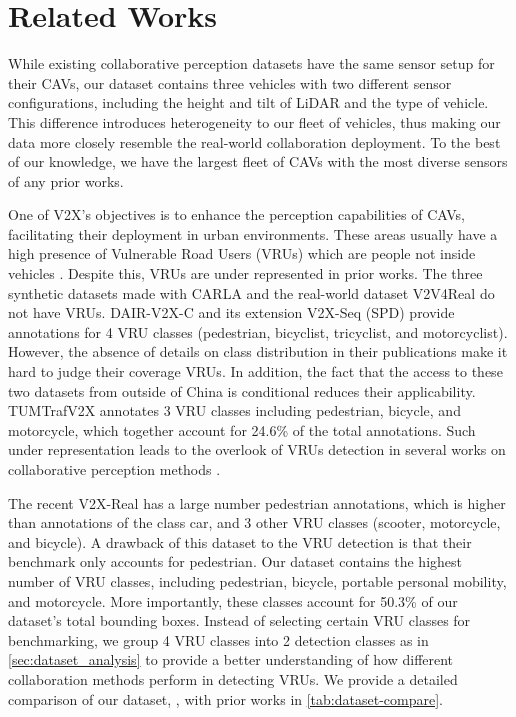 \section{Related Works}


While existing collaborative perception datasets have the same sensor setup for their CAVs, our dataset contains three vehicles with two different sensor configurations, including the height and tilt of LiDAR and the type of vehicle.
This difference introduces heterogeneity to our fleet of vehicles, thus making our data more closely resemble the real-world collaboration deployment.
To the best of our knowledge, we have the largest fleet of CAVs with the most diverse sensors of any prior works.

One of V2X's objectives is to enhance the perception capabilities of CAVs, facilitating their deployment in urban environments. 
These areas usually have a high presence of Vulnerable Road Users (VRUs) which are people not inside vehicles \cite{def_vru}. 
Despite this, VRUs are under represented in prior works.
The three synthetic datasets made with CARLA \cite{dosovitskiy2017carla} and the real-world dataset V2V4Real \cite{xu2023v2v4real} do not have VRUs.
DAIR-V2X-C \cite{yu2022dair} and its extension V2X-Seq (SPD) \cite{yu2023v2x} provide annotations for 4 VRU classes (pedestrian, bicyclist, tricyclist, and motorcyclist).
However, the absence of details on class distribution in their publications make it hard to judge their coverage VRUs.
In addition, the fact that the access to these two datasets from outside of China is conditional reduces their applicability.
TUMTrafV2X \cite{zimmer2024tumtraf} annotates 3 VRU classes including pedestrian, bicycle, and motorcycle, which together account for 24.6\% of the total annotations.
Such under representation leads to the overlook of VRUs detection in several works on collaborative perception methods \cite{wang2020v2vnet, li2021learning, xu2022opv2v, xu2022v2x}.

The recent V2X-Real \cite{xiang2024v2x} has a large number pedestrian annotations, which is higher than annotations of the class car, and 3 other VRU classes (scooter, motorcycle, and bicycle).
A drawback of this dataset to the VRU detection is that their benchmark only accounts for pedestrian.
Our dataset contains the highest number of VRU classes, including pedestrian, bicycle, portable personal mobility, and motorcycle.
More importantly, these classes account for 50.3\% of our dataset's total bounding boxes.
Instead of selecting certain VRU classes for benchmarking, we group 4 VRU classes into 2 detection classes as in 
\autoref{sec:dataset_analysis}
to provide a better understanding of how different collaboration methods perform in detecting VRUs. We provide a detailed comparison of our dataset, \ours, with prior works in \autoref{tab:dataset-compare}.


